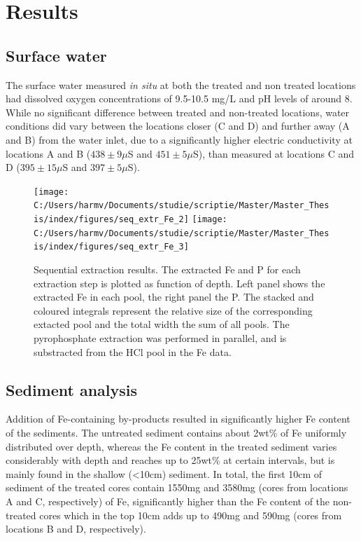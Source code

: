 \documentclass[a4paper,11pt]{article}
\begin{document}
\hypertarget{results}{%
\section{Results}\label{results}}

\hypertarget{surface-water}{%
\subsection{Surface water}\label{surface-water}}

The surface water measured \textit{in situ} at both the treated and non treated locations had dissolved oxygen concentrations of 9.5-10.5 mg/L and pH levels of around 8. While no significant difference between treated and non-treated locations, water conditions did vary between the locations closer (C and D) and further away (A and B) from the water inlet, due to a significantly higher electric conductivity at locations A and B (\(438\pm9\mu\)S and \(451\pm5\mu\)S), than measured at locations C and D (\(395\pm15\mu\)S and \(397\pm5\mu\)S).
\begin{figure}

{\centering \texttt{[image: C:/Users/harmv/Documents/studie/scriptie/Master/Master\_Thesis/index/figures/seq\_extr\_Fe\_2]} \texttt{[image: C:/Users/harmv/Documents/studie/scriptie/Master/Master\_Thesis/index/figures/seq\_extr\_Fe\_3]} 

}

\caption{Sequential extraction results. The extracted Fe and P for each extraction step is plotted as function of depth. Left panel shows the extracted Fe in each pool, the right panel the P.  The stacked and coloured integrals represent the relative size of the corresponding extacted pool and the total width the sum of all pools. The pyrophosphate extraction was performed in parallel, and is substracted from the HCl pool in the Fe data.   }\label{fig:seq}
\end{figure}
\hypertarget{sediment-analysis}{%
\subsection{Sediment analysis}\label{sediment-analysis}}

Addition of Fe-containing by-products resulted in significantly higher Fe content of the sediments. The untreated sediment contains about 2wt\% of Fe uniformly distributed over depth, whereas the Fe content in the treated sediment varies considerably with depth and reaches up to 25wt\% at certain intervals, but is mainly found in the shallow (\textless10cm) sediment. In total, the first 10cm of sediment of the treated cores contain 1550mg and 3580mg (cores from locations A and C, respectively) of Fe, significantly higher than the Fe content of the non-treated cores which in the top 10cm adds up to 490mg and 590mg (cores from locations B and D, respectively).
\end{document}
